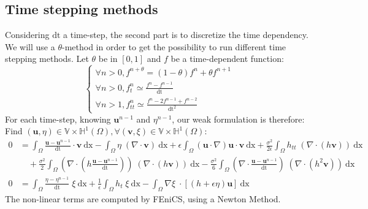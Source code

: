 \documentclass[11pt,a4paper]{article}
\begin{document}
\subsection{Time stepping methods}	
	Considering $\mathrm{dt}$ a time-step, the second part is to discretize the time dependency. We will use a $\theta$-method in order to get the possibility to run different time stepping methods. Let $\theta$ be in $[0,1] $ and $f$ be a time-dependent function: 	
	\begin{equation}
		\left\lbrace
			\begin{array}{l}
				\displaystyle \forall n > 0, f^{n+\theta} = (1-\theta)f^{n} + \theta f^{n+1}\\
				\displaystyle \forall n > 0, f_t^n \simeq \frac{f^n - f^{n-1}}{\mathrm{dt}} \\
				\displaystyle \forall n > 1, f_{tt}^n \simeq \frac{f^n -2f^{n-1} + f^{n-2}}{\mathrm{dt^2}} 
			\end{array}
		\right.
	\end{equation}
	For each time-step, knowing $\mathbf{u}^{n-1}$ and $\eta^{n-1}$, our weak formulation is therefore: Find $(\mathbf{u},\eta) \in \mathbb{V} \times \mathbb{H}^1(\Omega), \forall (\mathbf{v},\xi) \in \mathbb{V} \times \mathbb{H}^1(\Omega)$: 
	\begin{equation}
		\begin{split}
			0 &= \int_{\Omega} \! \frac{\mathbf{u} - \mathbf{u}^{n-1}}{\mathrm{dt}} \cdot \mathbf{v} \: \mathrm{dx} - \int_{\Omega} \! \eta \; (\nabla \cdot \mathbf{v}) \: \mathrm{dx} + \epsilon \! \int_{\Omega} \! (\mathbf{u} \cdot \nabla ) \mathbf{u} \cdot \mathbf{v} \: \mathrm{dx} + \frac{\sigma^2}{2 \epsilon} \! \int_{\Omega} \! h_{tt}  \; (\nabla \cdot( h \mathbf{v})) \: \mathrm{dx} \\ 
			&\quad + \frac{\sigma^2}{2} \! \int_{\Omega} \!  (\nabla \cdot (h \frac{\mathbf{u} - \mathbf{u}^{n-1}}{\mathrm{dt}})) \; (\nabla \cdot (h \mathbf{v}) )\: \mathrm{dx} - \frac{\sigma^2}{6} \! \int_{\Omega} \! (\nabla \cdot \frac{\mathbf{u} - \mathbf{u}^{n-1}}{\mathrm{dt}}) \; (\nabla  \cdot (h^2  \mathbf{v})) \: \mathrm{dx} \\
			\displaystyle 0 &= \int_{\Omega}\! \frac{\eta - \eta^{n-1}}{\mathrm{dt}} \; \xi \: \mathrm{dx} +\frac{1}{\epsilon}\int_{\Omega}\! h_t \; \xi \: \mathrm{dx} -\int_{\Omega}\! \nabla \xi \; \cdot [(h+\epsilon\eta) \mathbf{u}]  \: \mathrm{dx}
		\end{split}
	\end{equation}
	The non-linear terms are computed by FEniCS, using a Newton Method. 
	\cite{LoggMardalEtAl2012a}
	\cite{LoggWellsEtAl2012a}
	\cite{LoggWells2010a}
			
\end{document}
